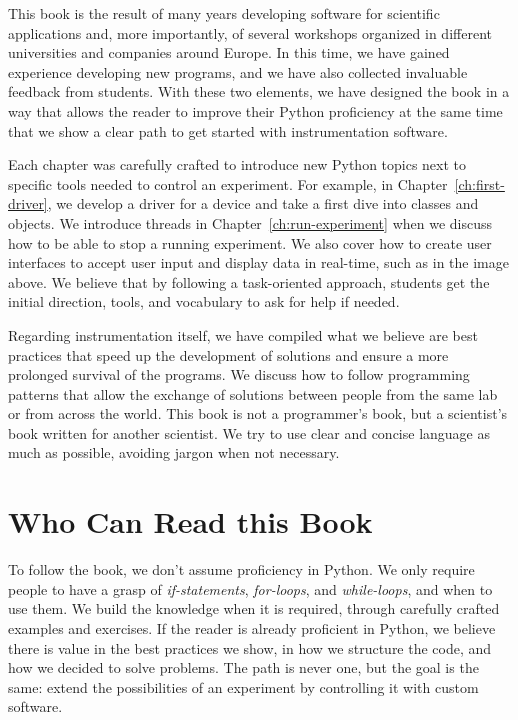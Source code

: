 This book is the result of many years developing software for scientific applications and, more importantly, of several workshops organized in different universities and companies around Europe. In this time, we have gained experience developing new programs, and we have also collected invaluable feedback from students. With these two elements, we have designed the book in a way that allows the reader to improve their Python proficiency at the same time that we show a clear path to get started with instrumentation software.

Each chapter was carefully crafted to introduce new Python topics next to specific tools needed to control an experiment. For example, in Chapter~\ref{ch:first-driver}, we develop a driver for a device and take a first dive into classes and objects. We introduce threads in Chapter~\ref{ch:run-experiment} when we discuss how to be able to stop a running experiment. We also cover how to create user interfaces to accept user input and display data in real-time, such as in the image above. We believe that by following a task-oriented approach, students get the initial direction, tools, and vocabulary to ask for help if needed.

Regarding instrumentation itself, we have compiled what we believe are best practices that speed up the development of solutions and ensure a more prolonged survival of the programs. We discuss how to follow programming patterns that allow the exchange of solutions between people from the same lab or from across the world. This book is not a programmer's book, but a scientist's book written for another scientist. We try to use clear and concise language as much as possible, avoiding jargon when not necessary.

\section{Who Can Read this Book}\label{sec:who-can-read-this-book}
To follow the book, we don't assume proficiency in Python. We only require people to have a grasp of \textit{if-statements}, \textit{for-loops}, and \textit{while-loops}, and when to use them. We build the knowledge when it is required, through carefully crafted examples and exercises. If the reader is already proficient in Python, we believe there is value in the best practices we show, in how we structure the code, and how we decided to solve problems. The path is never one, but the goal is the same: extend the possibilities of an experiment by controlling it with custom software.

